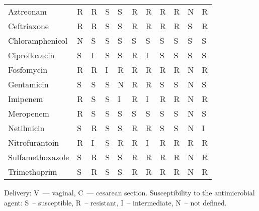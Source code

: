 \begin{table}
\begin{threeparttable}
\begin{tabularx}{\textwidth}{lllllllllll}
                          Aztreonam &           R &           R &           S &           S &      R &      R &      R &      R &      N &      R \\
                        Ceftriaxone &           R &           R &           S &           S &      R &      R &      R &      R &      S &      R \\
                    Chloramphenicol &           N &           S &           S &           S &      S &      S &      S &      S &      S &      S \\
                      Ciprofloxacin &           S &           I &           S &           S &      R &      I &      S &      S &      S &      S \\
                         Fosfomycin &           R &           R &           I &           R &      R &      R &      R &      R &      N &      R \\
                         Gentamicin &           S &           S &           S &           N &      R &      R &      S &      S &      N &      S \\
                           Imipenem &           R &           S &           S &           I &      R &      I &      R &      R &      N &      R \\
                          Meropenem &           R &           S &           S &           S &      S &      S &      S &      S &      N &      S \\
                         Netilmicin &           S &           R &           S &           S &      R &      R &      S &      S &      N &      I \\
                     Nitrofurantoin &           R &           I &           S &           R &      R &      I &      R &      R &      R &      R \\
                   Sulfamethoxazole &           S &           R &           S &           S &      R &      R &      R &      R &      N &      R \\
                       Trimethoprim &           S &           R &           S &           S &      R &      R &      R &      R &      N &      R \\
\bottomrule
\end{tabularx}

\begin{tablenotes}
\item
Delivery: V~--- vaginal, C~--- cesarean section.
Susceptibility to the antimicrobial agent: S~-- susceptible, R~-- resistant, I~-- intermediate, N~-- not defined.
\end{tablenotes}
\end{threeparttable}
\end{table}
